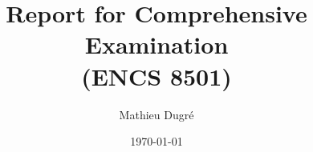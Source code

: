 \documentclass{report}
\title{Report for Comprehensive Examination\\(ENCS 8501)}
\author{Mathieu Dugr\'e}
\date{\today}  %
\begin{document}

\begin{titlepage}
	\maketitle 
	\thispagestyle{empty}
\end{titlepage}

\tableofcontents

\clearpage
{}









\end{document}
